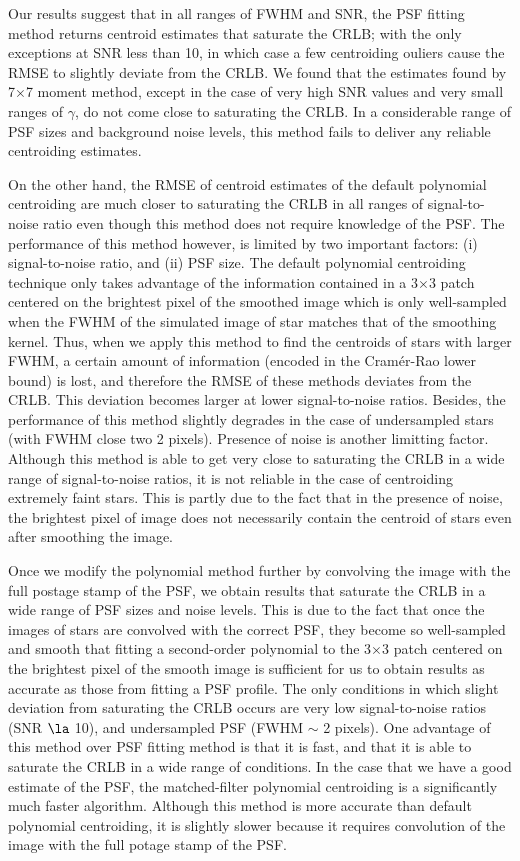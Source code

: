 \documentclass[12pt, preprint]{aastex}
\begin{document}
Our results suggest that in all ranges of FWHM and SNR, the PSF fitting method returns 
centroid estimates that saturate the CRLB; with the only exceptions at SNR less than 10, 
in which case a few centroiding ouliers cause the RMSE to slightly deviate
from the CRLB. We found that the estimates found by 7$\times$7 moment method, except in the case of
very high SNR values and very small ranges of $\gamma$, do not come close to
saturating the CRLB. In a considerable range of PSF sizes and background noise levels, 
this method fails to deliver any reliable centroiding estimates.
 
On the other hand, the RMSE of centroid estimates of the default polynomial centroiding are much 
closer to saturating the CRLB in all ranges of signal-to-noise ratio even though this method does not require knowledge of 
the PSF.
The performance of this method however, is limited by
two important factors: (i) signal-to-noise ratio, and (ii) PSF size.
The default polynomial centroiding technique only takes advantage of the information 
contained in a 3$\times$3 patch centered on the brightest pixel of the smoothed image which is only 
well-sampled when the FWHM of the simulated image of star 
matches that of the smoothing kernel. Thus, when we apply 
this method to find the centroids of stars with larger FWHM, a certain amount of
information (encoded in the Cram\'{e}r-Rao lower bound) is lost, and therefore the RMSE
of these methods deviates from the CRLB. This deviation becomes larger at lower
signal-to-noise ratios. Besides, the performance of this method slightly degrades
in the case of undersampled stars (with FWHM close two 2 pixels). 
Presence of noise is another limitting factor.
Although this method is able to get very close to saturating the CRLB in a wide range of
signal-to-noise ratios, it is not reliable in the case of centroiding extremely faint stars. 
This is partly due to the fact that in the presence of noise, 
the brightest pixel of image does not necessarily contain the centroid of stars even after smoothing 
the image.

Once we modify the polynomial method further by convolving the image with the full postage stamp
of the PSF, we obtain results that saturate the CRLB in a wide range of PSF sizes and noise levels.  
This is due to the fact that once the images of stars are convolved with the correct PSF, they become so well-sampled and smooth
that fitting a second-order polynomial to the 3$\times$3 patch centered on the brightest pixel of the smooth image is sufficient for us to obtain
results as accurate as those from fitting a PSF profile. The only conditions in which slight deviation from
saturating the CRLB occurs are very low signal-to-noise ratios (SNR $\la$ 10), and undersampled PSF (FWHM $\sim$ 2 pixels).
One advantage of this method over PSF fitting method is that it is fast, and that it is able to saturate the CRLB in 
a wide range of conditions. In the case that we have a good estimate of the PSF, the 
matched-filter polynomial centroiding is a significantly much faster algorithm. 
Although this method is more accurate than default polynomial centroiding, it is
slightly slower because it requires convolution of the image with the full potage stamp of the PSF. 
\end{document}
